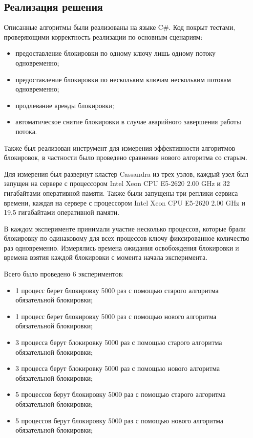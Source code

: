 \subsection{Реализация решения}

Описанные алгоритмы были реализованы на языке C\#. Код покрыт тестами, проверяющими корректность реализации по основным сценариям:
\begin{itemize}
	\item предоставление блокировки по одному ключу лишь одному потоку одновременно;
	\item предоставление блокировки по нескольким ключам нескольким потокам одновременно;
	\item продлевание аренды блокировки;
	\item автоматическое снятие блокировки в случае аварийного завершения работы потока.
\end{itemize}

Также был реализован инструмент для измерения эффективности алгоритмов блокировок, в частности было проведено сравнение нового алгоритма со старым.

Для измерения был развернут кластер Cassandra из трех узлов, каждый узел был запущен на сервере с процессором Intel Xeon CPU E5-2620 2.00 GHz и 32 гигабайтами оперативной памяти.
Также были запущены три реплики сервиса времени, каждая на сервере с процессором Intel Xeon CPU E5-2620 2.00 GHz и 19,5 гигабайтами оперативной памяти.

В каждом эксперименте принимали участие несколько процессов, которые брали блокировку по одинаковому для всех процессов ключу фиксированное количество раз одновременно.
Измерялись времена ожидания освобождения блокировки и времена взятия каждой блокировки с момента начала эксперимента.

Всего было проведено 6 экспериментов:
\begin{itemize}
	\item 1 процесс берет блокировку 5000 раз с помощью старого алгоритма обязательной блокировки;
	\item 1 процесс берет блокировку 5000 раз с помощью нового алгоритма обязательной блокировки;
	\item 3 процесса берут блокировку 5000 раз с помощью старого алгоритма обязательной блокировки;
	\item 3 процесса берут блокировку 5000 раз с помощью нового алгоритма обязательной блокировки;
	\item 5 процессов берут блокировку 5000 раз с помощью старого алгоритма обязательной блокировки;
	\item 5 процессов берут блокировку 5000 раз с помощью нового алгоритма обязательной блокировки;
\end{itemize}

